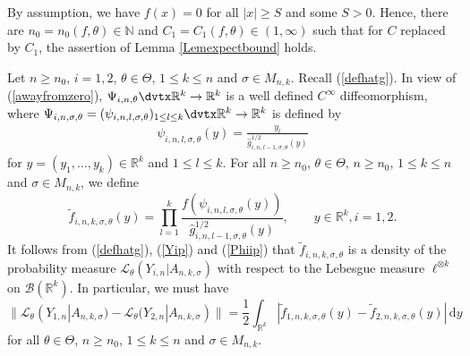 \documentclass[number,citesort,seceqn,dvips]{arxbj}
\newcommand{\eqref}[1]{(\ref{#1})}
\newcommand{\RR}{\mathbb{R}}
\newcommand{\NN}{\mathbb{N}}
\newcommand{\BBB}{{\mathcal B}}
\newcommand{\LLL}{{\mathcal L}}
\begin{document}
\begin{pf}
By assumption, we have $f(x)=0$ for all $|x|\ge S$ and some $S>0$.
Hence, there are $n_0=n_0(f,\theta)\in\NN$ and
$C_1=C_1(f,\theta)\in(1,\infty)$ such that for $C$ replaced by $C_1$,
the assertion of Lemma \ref{Lemexpectbound} holds.

Let $n\ge n_0$, $i=1,2$, $\theta\in\Theta$, $1 \le  k \le  n$ and
$\sigma\in M_{n,k}$. Recall \eqref{defhatg}. In view of
\eqref{awayfromzero}, $\Psi_{i,n,\theta}\dvtx\RR^k\to\RR^k$ is
a\vadjust{\goodbreak}
well defined $C^\infty$ diffeomorphism, where
$\Psi_{i,n,\sigma,\theta}=(\psi_{i,n,l,\sigma,\theta})_{1\le l\le
k}\dvtx\break\RR^k\to\RR^k$ is defined by
%
\begin{eqnarray}\label{Phiip}
\psi_{i,n,l,\sigma,\theta}(y)=\frac{y_l}{\hat
g^{1/2}_{i,n,l - 1,\sigma,\theta}(y)}
\end{eqnarray}
%
for $y=(y_1,\dots,y_k)\in\RR^k$ and $1\le l\le k$. For all $n\ge n_0$,
$\theta\in\Theta$, $n\ge n_0$, $1 \le  k \le  n$ and $\sigma
\in
M_{n,k}$, we define
%
\[
\tilde f_{i,n,k,\sigma,\theta}(y) =
\prod_{l=1}^k \frac{f(\psi_{i,n,l,\sigma,\theta}(y))}{\hat
g^{1/2}_{i,n,l - 1,\sigma,\theta}(y)},\qquad  y\in\RR^k ,
i=1,2 .
\]
%
It follows from \eqref{defhatg}, \eqref{Yip} and \eqref{Phiip} that
$\tilde f_{i,n,k,\sigma,\theta}$ is a density of the probability
measure $\LLL_\theta (Y_{i,n} |A_{n,k,\sigma} )$ with respect
to the Lebesgue measure $\ell^{\otimes k}$ on $\BBB(\RR^k)$. In
particular, we must have
%
\begin{equation}\label{condequal}
 \bigl\|\LLL_\theta (Y_{1,n} |A_{n,k,\sigma} )
-\LLL_\theta (Y_{2,n} |A_{n,k,\sigma} ) \bigr\|  =
\frac
12\int_{\RR^k}|\tilde f_{1,n,k,\sigma,\theta}(y)-\tilde
f_{2,n,k,\sigma,\theta}(y)|\,\mathrm{d}y
\end{equation}
%
for all $\theta\in\Theta$, $n\ge n_0$, $1 \le  k \le  n$ and
$\sigma\in M_{n,k}$.


\end{pf}
\end{document}
